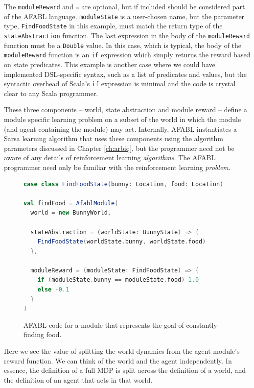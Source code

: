 The {\tt moduleReward} and {\tt =} are optional, but if included should be considered part of the AFABL language. {\tt moduleState} is a user-chosen name, but the parameter type, {\tt FindFoodState} in this example, must match the return type of the {\tt stateAbstraction} function. The last expression in the body of the {\tt moduleReward} function must be a {\tt Double} value. In this case, which is typical, the body of the {\tt moduleReward} function is an {\tt if} expression which simply returns the reward based on state predicates. This example is another case where we could have implemented DSL-specific syntax, such as a list of predicates and values, but the syntactic overhead of Scala's {\tt if} expression is minimal and the code is crystal clear to any Scala programmer.

These three components -- world, state abstraction and module reward -- define a module specific learning problem on a subset of the world in which the module (and agent containing the module) may act. Internally, AFABL instantiates a Sarsa learning algorithm that uses these components using the algorithm parameters discussed in Chapter \ref{ch:arbiq}, but the programmer need not be aware of any details of reinforcement learning {\it algorithms}. The AFABL programmer need only be familiar with the reinforcement learning {\it problem}.

\begin{figure}[ht]
\begin{center}

\begin{lstlisting}[language=Scala]
case class FindFoodState(bunny: Location, food: Location)

val findFood = AfablModule(
  world = new BunnyWorld,

  stateAbstraction = (worldState: BunnyState) => {
    FindFoodState(worldState.bunny, worldState.food)
  },

  moduleReward = (moduleState: FindFoodState) => {
    if (moduleState.bunny == moduleState.food) 1.0
    else -0.1
  }
)
\end{lstlisting}

\caption{AFABL code for a module that represents the goal of constantly finding food.}
\end{center}
\label{fig:find-food-code}
\end{figure}

Here we see the value of splitting the world dynamics from the agent module's reward function. We can think of the world and the agent independently. In essence, the definition of a full MDP is split across the definition of a world, and the definition of an agent that acts in that world.

